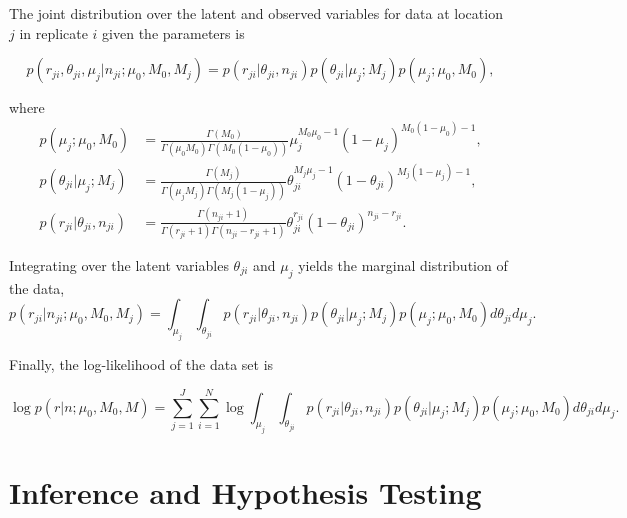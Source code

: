 \documentclass[11pt,reqno]{amsart}
\begin{document}
The joint distribution over the latent and observed variables for data at location $j$ in replicate $i$ given the parameters is

\begin{equation}\label{eqn:jointpdf}
p \left( r_{ji}, \theta_{ji}, \mu_j | n_{ji}; \mu_0, M_0, M_j \right) = p \left( r_{ji} | \theta_{ji}, n_{ji} \right) p\left( \theta_{ji} | \mu_j; M_j \right) p\left( \mu_j; \mu_0, M_0 \right),
\end{equation}

where
\begin{align}
p\left( \mu_j; \mu_0, M_0 \right)  &= \frac{ \Gamma(M_0) } { \Gamma(\mu_0 M_0) \Gamma(M_0 (1-\mu_0)) } \mu_j^{M_0\mu_0 -1} (1 - \mu_j)^{M_0 ( 1 - \mu_0) - 1}, \nonumber \\
p\left( \theta_{ji} | \mu_j; M_j \right) &= \frac{ \Gamma(M_j) } { \Gamma(\mu_j M_j) \Gamma(M_j (1-\mu_j)) } \theta_{ji}^{M_j\mu_j -1} (1 - \theta_{ji})^{M_j ( 1 - \mu_j) - 1}, \nonumber \\
p \left( r_{ji} | \theta_{ji}, n_{ji} \right) &= \frac{ \Gamma(n_{ji}+1) } { \Gamma(r_{ji}+1) \Gamma( n_{ji} - r_{ji} + 1 ) } \theta_{ji}^{r_{ji}} (1 - \theta_{ji})^{n_{ji} - r_{ji}}. \nonumber
\end{align}

Integrating over the latent variables $\theta_{ji}$ and $\mu_j$ yields the marginal distribution of the data, 
\begin{equation}
p \left( r_{ji} | n_{ji} ; \mu_0, M_0, M_j \right) = \int_{\mu_j} \int_{\theta_{ji}}  p \left( r_{ji} | \theta_{ji}, n_{ji} \right) p\left( \theta_{ji} | \mu_j; M_j \right) p\left( \mu_j; \mu_0, M_0 \right) d\theta_{ji} d\mu_j.
\end{equation}

Finally, the log-likelihood of the data set is

\begin{equation}
\log p \left( r | n ; \mu_0, M_0, M \right) = \sum_{j=1}^J \sum_{i=1}^N \log \int_{\mu_j} \int_{\theta_{ji}}  p \left( r_{ji} | \theta_{ji}, n_{ji} \right) p\left( \theta_{ji} | \mu_j; M_j \right) p\left( \mu_j; \mu_0, M_0 \right) d\theta_{ji} d\mu_j.
\end{equation}


\section{Inference and Hypothesis Testing}
\end{document}
